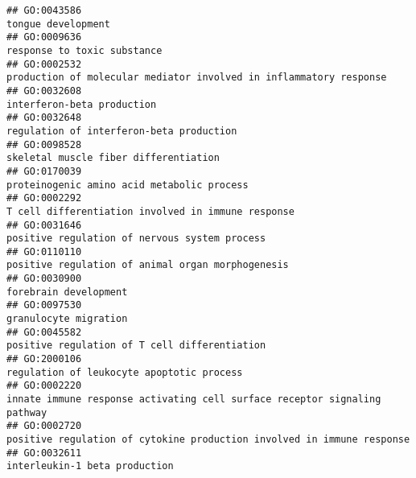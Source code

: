 \documentclass[
]{article}
\begin{document}
\begin{verbatim}
## GO:0043586                                                                                                                               tongue development
## GO:0009636                                                                                                                      response to toxic substance
## GO:0002532                                                                               production of molecular mediator involved in inflammatory response
## GO:0032608                                                                                                                       interferon-beta production
## GO:0032648                                                                                                         regulation of interferon-beta production
## GO:0098528                                                                                                            skeletal muscle fiber differentiation
## GO:0170039                                                                                                       proteinogenic amino acid metabolic process
## GO:0002292                                                                                               T cell differentiation involved in immune response
## GO:0031646                                                                                                    positive regulation of nervous system process
## GO:0110110                                                                                                positive regulation of animal organ morphogenesis
## GO:0030900                                                                                                                            forebrain development
## GO:0097530                                                                                                                            granulocyte migration
## GO:0045582                                                                                                    positive regulation of T cell differentiation
## GO:2000106                                                                                                        regulation of leukocyte apoptotic process
## GO:0002220                                                                        innate immune response activating cell surface receptor signaling pathway
## GO:0002720                                                                           positive regulation of cytokine production involved in immune response
## GO:0032611                                                                                                                    interleukin-1 beta production

\end{verbatim}
\end{document}
